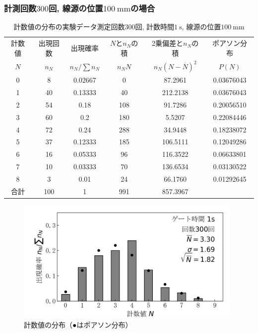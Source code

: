 \documentclass{jarticle}
\begin{document}
\subsubsection{計測回数$300$回, 線源の位置$100\ \mathrm{mm}$の場合}


\begin{table}[H]
  \caption{計数値の分布の実験データ\protect\linebreak 測定回数$300$回, 計数時間$1\ \mathrm{s}$, 線源の位置$100\ \mathrm{mm}$}
  \label{tb:count-distribution-100mm-300times}
  \hspace{-1cm}
  \begin{tabular}{cccccc}
    \hline
    計数値 & 出現回数 & 出現確率 & $N$と$n_N$の積 & 2乗偏差と$n_N$の積 & ポアソン分布 \\
    $N$ & $n_N$ & $n_N/\sum n_N$ & $n_N N$ & $n_N(N-\overline{N})^2$ & $P(N)$ \\
    \hline
    0 & 8 & 0.02667 & 0 & 87.2961 & 0.03676043 \\
    1 & 40 & 0.13333 & 40 & 212.2138 & 0.03676043 \\
    2 & 54 & 0.18 & 108 & 91.7286 & 0.20056510 \\
    3 & 60 & 0.2 & 180 & 5.5207 & 0.22084446 \\
    4 & 72 & 0.24 & 288 & 34.9448 & 0.18238072 \\
    5 & 37 & 0.12333 & 185 & 106.5111 & 0.12049286 \\
    6 & 16 & 0.05333 & 96 & 116.3522 & 0.06633801 \\
    7 & 10 & 0.03333 & 70 & 136.6534 & 0.03130522 \\
    8 & 3 & 0.01 & 24 & 66.1760 & 0.01292645 \\
    \hline
    合計 & 100 & 1 & 991 & 857.3967 & \\
    \hline
  \end{tabular}
\end{table}

\begin{figure}[H]
  \begin{center}
    \includegraphics[width=110mm]{graph/count-distribution-100mm-300times.png}
    \caption{計数値の分布（●はポアソン分布）}
    \label{fg:count-distribution-100mm-300times}
  \end{center}
\end{figure}
\end{document}
